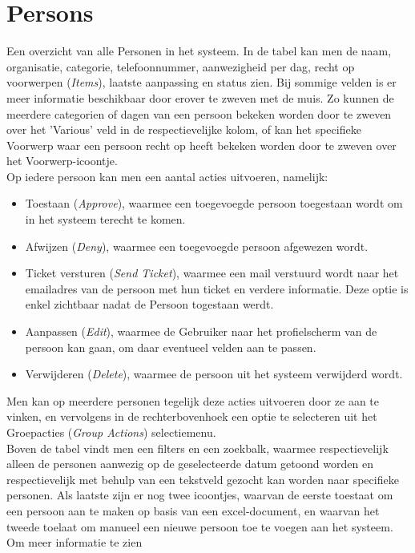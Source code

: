 \documentclass[]{memoir}
\begin{document}
\section{Persons}
Een overzicht van alle Personen in het systeem. In de tabel kan men de naam, organisatie, categorie, telefoonnummer, aanwezigheid per dag, recht op voorwerpen (\textsl{Items}), laatste aanpassing en status zien. Bij sommige velden is er meer informatie beschikbaar door erover te zweven met de muis. Zo kunnen de meerdere categorien of dagen van een persoon bekeken worden door te zweven over het 'Various' veld in de respectievelijke kolom, of kan het specifieke Voorwerp waar een persoon recht op heeft bekeken worden door te zweven over het Voorwerp-icoontje.\\
Op iedere persoon kan men een aantal acties uitvoeren, namelijk:
\begin{itemize}
	\item Toestaan (\textsl{Approve}), waarmee een toegevoegde persoon toegestaan wordt om in het systeem terecht te komen.
	\item Afwijzen  (\textsl{Deny}), waarmee een toegevoegde persoon afgewezen wordt.
	\item Ticket versturen (\textsl{Send Ticket}), waarmee een mail verstuurd wordt naar het emailadres van de persoon met hun ticket en verdere informatie. Deze optie is enkel zichtbaar nadat de Persoon togestaan werdt.
	\item Aanpassen (\textsl{Edit}), waarmee de Gebruiker naar het profielscherm van de persoon kan gaan, om daar eventueel velden aan te passen.
	\item Verwijderen (\textsl{Delete}), waarmee de persoon uit het systeem verwijderd wordt.
\end{itemize}

 
Men kan op meerdere personen tegelijk deze acties uitvoeren door ze aan te vinken, en vervolgens in de rechterbovenhoek een optie te selecteren uit het Groepacties  (\textsl{Group Actions}) selectiemenu.\\
Boven de tabel vindt men een filters en een zoekbalk, waarmee respectievelijk alleen de personen aanwezig op de geselecteerde datum getoond worden en respectievelijk met behulp van een tekstveld gezocht kan worden naar specifieke personen. Als laatste zijn er nog twee icoontjes, waarvan de eerste toestaat om een persoon aan te maken op basis van een excel-document, en waarvan het tweede toelaat om manueel een nieuwe persoon toe te voegen aan het systeem.\\
Om meer informatie te zien 
\end{document}
